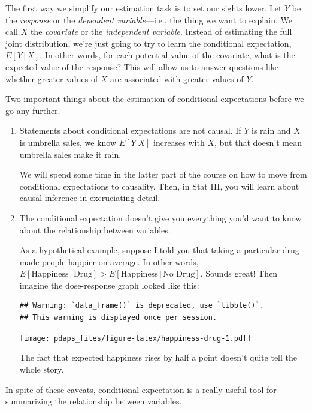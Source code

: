 \documentclass[
  12pt,
  oneside,openany]{book}
\begin{document}
The first way we simplify our estimation task is to set our sights lower. Let \(Y\) be the \emph{response} or the \emph{dependent variable}---i.e., the thing we want to explain. We call \(X\) the \emph{covariate} or the \emph{independent variable}. Instead of estimating the full joint distribution, we're just going to try to learn the conditional expectation, \(E[Y \,|\, X]\). In other words, for each potential value of the covariate, what is the expected value of the response? This will allow us to answer questions like whether greater values of \(X\) are associated with greater values of \(Y\).

Two important things about the estimation of conditional expectations before we go any further.

\begin{enumerate}
\def\labelenumi{\arabic{enumi}.}
\item
  Statements about conditional expectations are not causal. If \(Y\) is rain and \(X\) is umbrella sales, we know \(E[Y | X]\) increases with \(X\), but that doesn't mean umbrella sales make it rain.

  We will spend some time in the latter part of the course on how to move from conditional expectations to causality. Then, in Stat III, you will learn about causal inference in excruciating detail.
\item
  The conditional expectation doesn't give you everything you'd want to know about the relationship between variables.

  As a hypothetical example, suppose I told you that taking a particular drug made people happier on average. In other words, \(E[\text{Happiness} \,|\, \text{Drug}] > E[\text{Happiness} \,|\, \text{No Drug}]\). Sounds great! Then imagine the dose-response graph looked like this:

\begin{verbatim}
## Warning: `data_frame()` is deprecated, use `tibble()`.
## This warning is displayed once per session.
\end{verbatim}

  \texttt{[image: pdaps\_files/figure-latex/happiness-drug-1.pdf]}

  The fact that expected happiness rises by half a point doesn't quite tell the whole story.
\end{enumerate}

In spite of these caveats, conditional expectation is a really useful tool for summarizing the relationship between variables.
\end{document}
